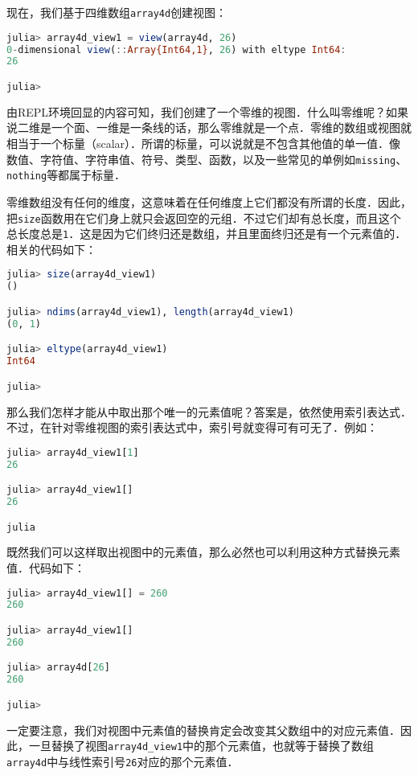 现在，我们基于四维数组\verb|array4d|创建视图：

\begin{lstlisting}[language=julia]
julia> array4d_view1 = view(array4d, 26)
0-dimensional view(::Array{Int64,1}, 26) with eltype Int64:
26

julia> 
\end{lstlisting}

由REPL环境回显的内容可知，我们创建了一个零维的视图．什么叫零维呢？如果说二维是一个面、一维是一条线的话，那么零维就是一个点．零维的数组或视图就相当于一个标量（scalar）．所谓的标量，可以说就是不包含其他值的单一值．像数值、字符值、字符串值、符号、类型、函数，以及一些常见的单例如\verb|missing|、\verb|nothing|等都属于标量．

零维数组没有任何的维度，这意味着在任何维度上它们都没有所谓的长度．因此，把\verb|size|函数用在它们身上就只会返回空的元组．不过它们却有总长度，而且这个总长度总是\verb|1|．这是因为它们终归还是数组，并且里面终归还是有一个元素值的．相关的代码如下：

\begin{lstlisting}[language=julia]
julia> size(array4d_view1)
()

julia> ndims(array4d_view1), length(array4d_view1)
(0, 1)

julia> eltype(array4d_view1)
Int64

julia> 
\end{lstlisting}

那么我们怎样才能从中取出那个唯一的元素值呢？答案是，依然使用索引表达式．不过，在针对零维视图的索引表达式中，索引号就变得可有可无了．例如：

\begin{lstlisting}[language=julia]
julia> array4d_view1[1]
26

julia> array4d_view1[]
26

julia
\end{lstlisting}

既然我们可以这样取出视图中的元素值，那么必然也可以利用这种方式替换元素值．代码如下：

\begin{lstlisting}[language=julia]
julia> array4d_view1[] = 260
260

julia> array4d_view1[]
260

julia> array4d[26]
260

julia> 
\end{lstlisting}

一定要注意，我们对视图中元素值的替换肯定会改变其父数组中的对应元素值．因此，一旦替换了视图\verb|array4d_view1|中的那个元素值，也就等于替换了数组\verb|array4d|中与线性索引号\verb|26|对应的那个元素值．

